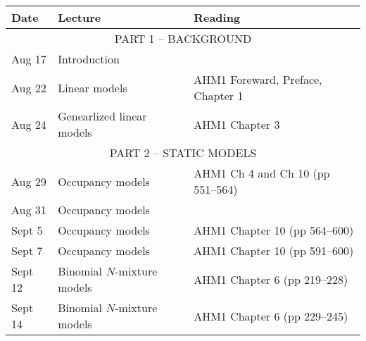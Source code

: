 \documentclass[12pt]{article}
\begin{document}
\begin{center}
\begin{tabular}[c]{lll}
\hline \hline
{\bf Date} & {\bf Lecture}                                & {\bf Reading}                                        \\
\hline
           \multicolumn{3}{c}{PART 1 -- BACKGROUND}                                                              \\
\hline
Aug 17     & Introduction                                 &                                                      \\
\hline
Aug 22     & Linear models                                & AHM1 Foreward, Preface, Chapter 1                    \\
Aug 24     & Genearlized linear models                    & AHM1 Chapter 3                                    \\
\hline
           \multicolumn{3}{c}{PART 2 -- STATIC MODELS}                                                           \\
\hline
Aug 29     & Occupancy models                             & AHM1 Ch 4 and Ch 10 (pp 551--564)                    \\
Aug 31     & Occupancy models                             &                                                      \\
\hline
Sept 5     & Occupancy models                             & AHM1 Chapter 10 (pp 564--600)                        \\
Sept 7     & Occupancy models                             & AHM1 Chapter 10 (pp 591--600)                        \\
\hline
Sept 12    & Binomial $N$-mixture models                  & AHM1 Chapter 6 (pp 219--228)                         \\
Sept 14    & Binomial $N$-mixture models                  & AHM1 Chapter 6 (pp 229--245)                         \\

\end{tabular}
\end{center}
\end{document}
